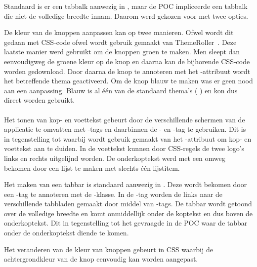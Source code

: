 Standaard is er een tabbalk aanwezig in \jqm, maar de POC impliceerde een tabbalk die niet de volledige breedte innam.
Daarom werd gekozen voor  met twee opties.

De kleur van de knoppen aanpassen kan op twee manieren. 
Ofwel wordt dit gedaan met CSS-code ofwel wordt gebruik gemaakt van ThemeRoller~\cite{JQuery2012c}. 
Deze laatste manier werd gebruikt om de knoppen groen te maken. 
Men sleept dan eenvoudigweg de groene kleur op de knop en daarna kan de bijhorende CSS-code worden gedownload. 
Door daarna de knop te annoteren met het -attribuut wordt het betreffende thema geactiveerd. 
Om de knop blauw te maken was er geen nood aan een aanpassing.
Blauw is al één van de standaard thema's ( ) en kon dus direct worden gebruikt.

\paragraph{\lungo}
Het tonen van kop- en voettekst gebeurt door de verschillende schermen van de applicatie te omvatten met -tags en daarbinnen de - en -tag te gebruiken.
Dit is in tegenstelling tot \jqm{} waarbij wordt gebruik gemaakt van het -attribuut om kop- en voettekst aan te duiden.
In de voettekst kunnen door CSS-regels de twee logo's links en rechts uitgelijnd worden.
De onderkoptekst werd met een omweg bekomen door een lijst te maken met slechts één lijstitem.

Het maken van een tabbar is standaard aanwezig in \lungo{}.
Deze wordt bekomen door een -tag te annoteren met de -klasse.
In de -tag worden de links naar de verschillende tabbladen gemaakt door middel van -tags.
De tabbar wordt getoond over de volledige breedte en komt onmiddellijk onder de koptekst en dus boven de onderkoptekst.
Dit in tegenstelling tot het gevraagde in de POC waar de tabbar onder de onderkoptekst diende te komen.

Het veranderen van de kleur van knoppen gebeurt in CSS waarbij de achtergrondkleur van de knop eenvoudig kan worden aangepast.


\subsection{}
\label{sec:evaluatie-gebruik-toestel}

